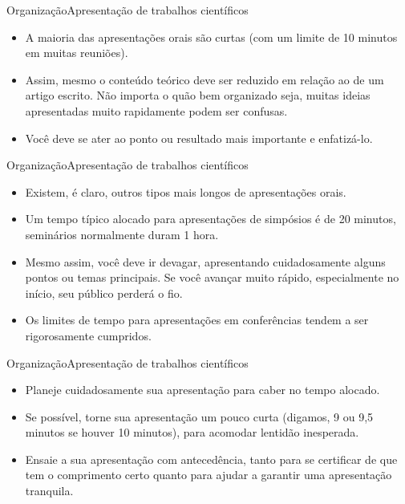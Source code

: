 \documentclass[t]{beamer}
\begin{document}

\begin{ftst}{Organização}{Apresentação de trabalhos científicos}
\begin{itemize}
    \item A maioria das apresentações orais são curtas (com um limite de 10 minutos em muitas reuniões). 
    \item Assim, mesmo o conteúdo teórico deve ser reduzido em relação ao de um artigo escrito. Não importa o quão bem organizado seja, muitas ideias apresentadas muito rapidamente podem ser confusas. 
    \item Você deve se ater ao ponto ou resultado mais importante e enfatizá-lo. 
\end{itemize}
\end{ftst}


\begin{ftst}{Organização}{Apresentação de trabalhos científicos}
\begin{itemize}
    \item Existem, é claro, outros tipos mais longos de apresentações orais. 
    \item Um tempo típico alocado para apresentações de simpósios é de 20 minutos, seminários normalmente duram 1 hora. 
    \item Mesmo assim, você deve ir devagar, apresentando cuidadosamente alguns pontos ou temas principais. Se você avançar muito rápido, especialmente no início, seu público perderá o fio. 
    \item Os limites de tempo para apresentações em conferências tendem a ser rigorosamente cumpridos.
\end{itemize}
\end{ftst}


\begin{ftst}{Organização}{Apresentação de trabalhos científicos}
\begin{itemize}
    \item Planeje cuidadosamente sua apresentação para caber no tempo alocado. 
    \item Se possível, torne sua apresentação um pouco curta (digamos, 9 ou 9,5 minutos se houver 10 minutos), para acomodar lentidão inesperada. 
    \item Ensaie a sua apresentação com antecedência, tanto para se certificar de que tem o comprimento certo quanto para ajudar a garantir uma apresentação tranquila. 
\end{itemize}
\end{ftst}
\end{document}
